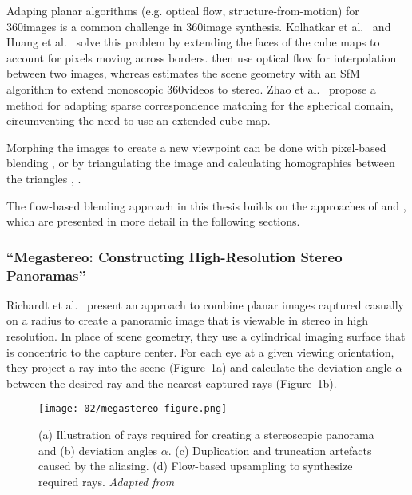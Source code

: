 Adaping planar algorithms (e.g. optical flow, structure-from-motion) for 360\degree images is a common challenge in 360\degree image synthesis. Kolhatkar et al.\ \cite{360flowblending} and Huang et al.\ \cite{6dof} solve this problem by extending the faces of the cube maps to account for pixels moving across borders. \cite{360flowblending} then use optical flow for interpolation between two images, whereas \cite{6dof} estimates the scene geometry with an SfM algorithm to extend monoscopic 360\degree videos to stereo. Zhao et al.\ \cite{cube2video} propose a method for adapting sparse correspondence matching for the spherical domain, circumventing the need to use an extended cube map.

Morphing the images to create a new viewpoint can be done with pixel-based blending \cite{megastereo}, \cite{360flowblending} or by triangulating the image and calculating homographies between the triangles \cite{6dof}, \cite{cube2video}.



The flow-based blending approach in this thesis builds on the approaches of \cite{megastereo} and \cite{360flowblending}, which are presented in more detail in the following sections.

\subsubsection{``Megastereo: Constructing High-Resolution Stereo Panoramas'' \cite{megastereo} \label{subsec:megastereo}}
Richardt et al.\ \cite{megastereo} present an approach to combine planar images captured casually on a radius to create a panoramic image that is viewable in stereo in high resolution. In place of scene geometry, they use a cylindrical imaging surface that is concentric to the capture center. For each eye at a given viewing orientation, they project a ray into the scene (Figure~\ref{fig:megastereo}a) and calculate the deviation angle $\alpha$ between the desired ray and the nearest captured rays (Figure~\ref{fig:megastereo}b). 

\begin{figure}[]
\centering
\texttt{[image: 02/megastereo-figure.png]}
\caption[Flow-based blending in Megastereo \cite{megastereo}]{(a) Illustration of rays required for creating a stereoscopic panorama and (b) deviation angles $\alpha$. (c) Duplication and truncation artefacts caused by the aliasing. (d) Flow-based upsampling to synthesize required rays. \emph{Adapted from \cite{megastereo}}}
\label{fig:megastereo}
\end{figure}

